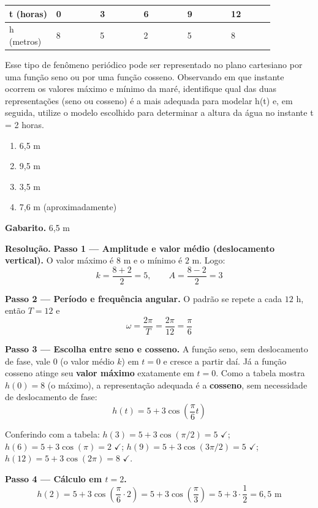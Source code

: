\documentclass[11pt,a4paper]{article}
\begin{document}
\begin{center}
\begin{tabular}{|p{0.143\linewidth}|p{0.143\linewidth}|p{0.143\linewidth}|p{0.143\linewidth}|p{0.143\linewidth}|p{0.143\linewidth}|}
\hline
\textbf{t (horas)} & \textbf{0} & \textbf{3} & \textbf{6} & \textbf{9} & \textbf{12} \\
\hline
h (metros) & 8 & 5 & 2 & 5 & 8 \\
\hline
\end{tabular}
\end{center}

Esse tipo de fenômeno periódico pode ser representado no plano cartesiano por uma função seno ou por uma função cosseno. Observando em que instante ocorrem os valores máximo e mínimo da maré, identifique qual das duas representações (seno ou cosseno) é a mais adequada para modelar h(t) e, em seguida, utilize o modelo escolhido para determinar a altura da água no instante t = 2 horas.
\begin{enumerate}[label=(\alph*)]
\item 6,5 m
\item 9,5 m
\item 3,5 m
\item 7,6 m (aproximadamente)
\end{enumerate}

\textbf{Gabarito.} 6,5 m

\textbf{Resolução.} \textbf{Passo 1 — Amplitude e valor médio (deslocamento vertical).}
O valor máximo é $8$ m e o mínimo é $2$ m. Logo:
$$k=\frac{8+2}{2}=5,\qquad A=\frac{8-2}{2}=3$$

\textbf{Passo 2 — Período e frequência angular.}
O padrão se repete a cada $12$ h, então $T=12$ e
$$\omega=\frac{2\pi}{T}=\frac{2\pi}{12}=\frac{\pi}{6}$$

\textbf{Passo 3 — Escolha entre seno e cosseno.}
A função seno, sem deslocamento de fase, vale $0$ (o valor médio $k$) em $t=0$ e cresce a partir daí. Já a função cosseno atinge seu \textbf{valor máximo} exatamente em $t=0$. Como a tabela mostra $h(0)=8$ (o máximo), a representação adequada é a \textbf{cosseno}, sem necessidade de deslocamento de fase:
$$h(t)=5+3\cos\left(\frac{\pi}{6}t\right)$$

Conferindo com a tabela: $h(3)=5+3\cos(\pi/2)=5$ $\checkmark$; $h(6)=5+3\cos(\pi)=2$ $\checkmark$; $h(9)=5+3\cos(3\pi/2)=5$ $\checkmark$; $h(12)=5+3\cos(2\pi)=8$ $\checkmark$.

\textbf{Passo 4 — Cálculo em $t=2$.}
$$h(2)=5+3\cos\left(\frac{\pi}{6}\cdot 2\right)=5+3\cos\left(\frac{\pi}{3}\right)=5+3\cdot\frac{1}{2}=6{,}5\text{ m}$$
\end{document}
